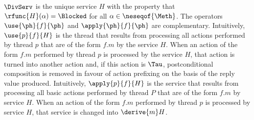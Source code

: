 \documentclass[fleqn]{llncs}
\begin{document}
$\DivServ$ is the unique service $H$ with the property that
$\rfunc{H}(\alpha) = \Blocked$ for all $\alpha \in \neseqof{\Meth}$.
The operators $\use{\ph}{f}{\ph}$ and $\apply{\ph}{f}{\ph}$ are
complementary.
Intuitively, $\use{p}{f}{H}$ is the thread that results from processing
all actions performed by thread $p$ that are of the form $f.m$ by the
service $H$.
When an action of the form $f.m$ performed by thread $p$ is processed by
the service $H$, that action is turned into another action and, if this
action is $\Tau$, postconditional composition is removed in favour of
action prefixing on the basis of the reply value produced.
Intuitively, $\apply{p}{f}{H}$ is the service that results from
processing all basic actions performed by thread $P$ that are of the
form $f.m$ by service $H$.
When an action of the form $f.m$ performed by thread $p$ is processed by
service $H$, that service is changed into $\derive{m}H$.
\end{document}
